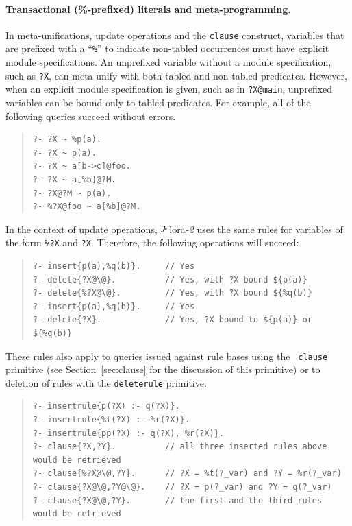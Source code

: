 \documentclass[11pt]{article}
\newcommand{\FLSYSTEM}{{\mbox{\sc ${\cal F}${lora}\rm\emph{-2}}}\xspace}
\begin{document}
\paragraph{Transactional (\%-prefixed) literals and meta-programming.}
In meta-unifications, update operations and the {\tt clause} construct,
variables that are prefixed with a ``{\tt \%}'' to indicate non-tabled
occurrences must have explicit module specifications. An unprefixed
variable without a module specification, such as {\tt ?X}, can meta-unify
with both tabled and non-tabled predicates.  However, when an explicit
module specification is given, such as in {\tt ?X@main}, unprefixed
variables can be bound only to tabled predicates. For example,
all of the following queries succeed without errors.

\begin{quote}
\begin{verbatim}
?- ?X ~ %p(a).      
?- ?X ~ p(a).         
?- ?X ~ a[b->c]@foo.  
?- ?X ~ a[%b]@?M.      
?- ?X@?M ~ p(a).     
?- %?X@foo ~ a[%b]@?M.
\end{verbatim}
\end{quote}

In the context of update operations, \FLSYSTEM uses the same rules for
variables of the form {\tt \%?X} and {\tt ?X}. Therefore, the
following operations will succeed:
\begin{quote}
\begin{verbatim}
?- insert{p(a),%q(b)}.     // Yes
?- delete{?X@\@}.          // Yes, with ?X bound ${p(a)}
?- delete{%?X@\@}.         // Yes, with ?X bound ${%q(b)}
?- insert{p(a),%q(b)}.     // Yes
?- delete{?X}.             // Yes, ?X bound to ${p(a)} or ${%q(b)}
\end{verbatim}
\end{quote}

These rules also apply to queries issued against rule bases using the {\tt
  clause} primitive (see Section~\ref{sec:clause} for the discussion of this
primitive) or to deletion of rules with the {\tt deleterule} primitive.

\begin{quote}
\begin{verbatim}
?- insertrule{p(?X) :- q(?X)}.  
?- insertrule{%t(?X) :- %r(?X)}.
?- insertrule{pp(?X) :- q(?X), %r(?X)}.
?- clause{?X,?Y}.          // all three inserted rules above would be retrieved
?- clause{%?X@\@,?Y}.      // ?X = %t(?_var) and ?Y = %r(?_var)
?- clause{?X@\@,?Y@\@}.    // ?X = p(?_var) and ?Y = q(?_var)
?- clause{?X@\@,?Y}.       // the first and the third rules would be retrieved
\end{verbatim}
\end{quote}
\end{document}

